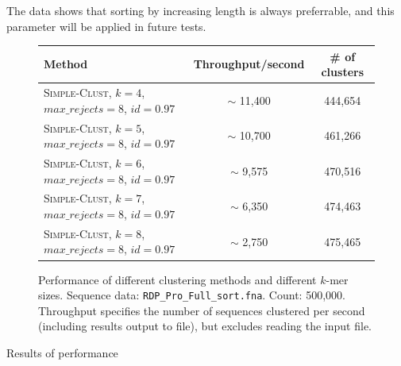The data shows that sorting by increasing length is always preferrable, and
this parameter will be applied in future tests.

\begin{figure}[H]
  \centering
  \begin{tabular}{ p{12em} | c | c }
    Method  & Throughput/second   & \# of clusters \\
    \hline \hline
    \textsc{Simple-Clust}, $k=4$,
    $max\_rejects=8$, $id=0.97$     & $\sim$ 11,400  & 444,654  \\
    \hline
    \textsc{Simple-Clust}, $k=5$,
    $max\_rejects=8$, $id=0.97$     & $\sim$ 10,700  & 461,266  \\
    \hline
    \textsc{Simple-Clust}, $k=6$,
    $max\_rejects=8$, $id=0.97$     & $\sim$ 9,575   & 470,516  \\
    \hline
    \textsc{Simple-Clust}, $k=7$,
    $max\_rejects=8$, $id=0.97$     & $\sim$ 6,350   & 474,463  \\
    \hline
    \textsc{Simple-Clust}, $k=8$,
    $max\_rejects=8$, $id=0.97$     & $\sim$ 2,750   & 475,465  \\
  \end{tabular}
  \caption{Performance of different clustering methods and different $k$-mer
  sizes. Sequence data:
           \texttt{RDP\_Pro\_Full\_sort.fna}. Count: 500,000. Throughput
           specifies the number of sequences clustered per second (including
           results output to file), but excludes reading the input file.}
\end{figure}

Results of performance

